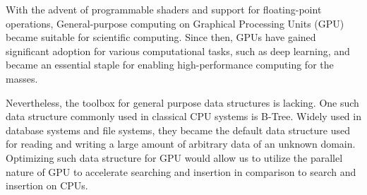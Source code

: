 With the advent of programmable shaders and support for floating-point operations, General-purpose computing on Graphical Processing Units (GPU) became suitable for scientific computing. Since then, GPUs have gained significant adoption for various computational tasks, such as deep learning, and became an essential staple for enabling high-performance computing for the masses.

Nevertheless, the toolbox for general purpose data structures is lacking. One such data structure commonly used in classical CPU systems is B-Tree. Widely used in database systems and file systems, they became the default data structure used for reading and writing a large amount of arbitrary data of an unknown domain. Optimizing such data structure for GPU would allow us to utilize the parallel nature of GPU to accelerate searching and insertion in comparison to search and insertion on CPUs.
